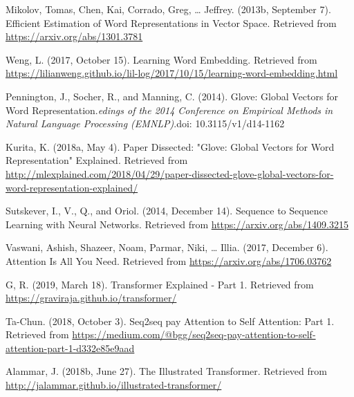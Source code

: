 \begin{frame}{}
    
    
    \begin{enumerateSpaced}{2pt}
    
        \scriptsize
        
        \item Mikolov, Tomas, Chen, Kai, Corrado, Greg, … Jeffrey. (2013b, September 7). Efficient Estimation of Word Representations in Vector Space. Retrieved from \url{https://arxiv.org/abs/1301.3781}
        
        \item Weng, L. (2017, October 15). Learning Word Embedding. Retrieved from \url{https://lilianweng.github.io/lil-log/2017/10/15/learning-word-embedding.html}
        
        \item Pennington, J., Socher, R., and Manning, C. (2014). Glove: Global Vectors for Word Representation.\emph{edings of the 2014 Conference on Empirical Methods in Natural Language Processing (EMNLP)}.doi: 10.3115/v1/d14-1162
        
        \item Kurita, K. (2018a, May 4). Paper Dissected: "Glove: Global Vectors for Word Representation" Explained. Retrieved from \url{http://mlexplained.com/2018/04/29/paper-dissected-glove-global-vectors-for-word-representation-explained/}
        
        \item Sutskever, I., V., Q., and Oriol. (2014, December 14). Sequence to Sequence Learning with Neural Networks. Retrieved from \url{https://arxiv.org/abs/1409.3215}
        
        \item Vaswani, Ashish, Shazeer, Noam, Parmar, Niki, … Illia. (2017, December 6). Attention Is All You Need. Retrieved from \url{https://arxiv.org/abs/1706.03762}
        
        \item G, R. (2019, March 18). Transformer Explained - Part 1. Retrieved from \url{https://graviraja.github.io/transformer/}
        
        \item Ta-Chun. (2018, October 3). Seq2seq pay Attention to Self Attention: Part 1. Retrieved from \url{https://medium.com/@bgg/seq2seq-pay-attention-to-self-attention-part-1-d332e85e9aad}
        
        \item Alammar, J. (2018b, June 27). The Illustrated Transformer. Retrieved from \url{http://jalammar.github.io/illustrated-transformer/}
    
    \end{enumerateSpaced}
    
\end{frame}
